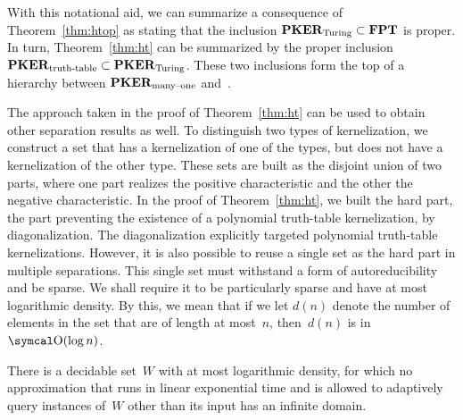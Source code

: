 With this notational aid, we can summarize a consequence of Theorem~\ref{thm:htop} as stating that the inclusion $\textnormal{\textbf{PKER}}_\textnormal{Turing} \subset \textnormal{\textbf{FPT}}$ is proper.
In turn, Theorem~\ref{thm:ht} can be summarized by the proper inclusion $\textnormal{\textbf{PKER}}_\textnormal{truth-table} \subset \textnormal{\textbf{PKER}}_\textnormal{Turing}$.
These two inclusions form the top of a hierarchy between $\textnormal{\textbf{PKER}}_\textnormal{many--one}$ and~.

The approach taken in the proof of Theorem~\ref{thm:ht} can be used to obtain other separation results as well.
To distinguish two types of kernelization, we construct a set that has a kernelization of one of the types, but does not have a kernelization of the other type.
These sets are built as the disjoint union of two parts, where one part realizes the positive characteristic and the other the negative characteristic.
In the proof of Theorem~\ref{thm:ht}, we built the hard part, the part preventing the existence of a polynomial truth-table kernelization, by diagonalization.
The diagonalization explicitly targeted polynomial truth-table kernelizations.
However, it is also possible to reuse a single set as the hard part in multiple separations.
This single set must withstand a form of autoreducibility and be sparse.
We shall require it to be particularly sparse and have at most logarithmic density.
By this, we mean that if we let $d(n)$ denote the number of elements in the set that are of length at most~$n$, then~$d(n)$ is in~$\bigO(\log n)$.
\begin{lemma}
\label{lem:nonreducible}%
  There is a decidable set~$W$ with at most logarithmic density, for which no approximation that runs in linear exponential time and is allowed to adaptively query instances of~$W$ other than its input has an infinite domain.
\end{lemma}
